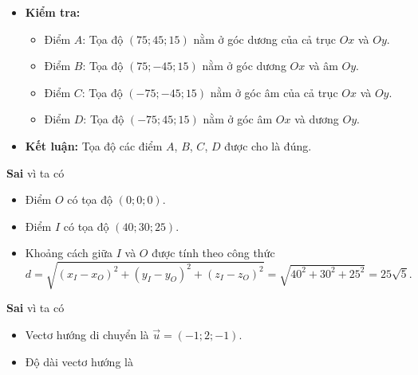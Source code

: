 \begin{ex}
{\begin{itemchoice}
\begin{itemize}
			\begin{itemize}
				\item Chiều dài sân vận động là $150$ m, nên trục $Ox$ chạy từ $-75$ m đến $+75$ m.
				\item Chiều rộng sân vận động là $90$ m, nên trục $Oy$ chạy từ $-45$ m đến $+45$ m.
				\item Các flycam được đặt cách đều mặt đất $30$ m. Thiết bị điều khiển trung tâm $O$ cách mặt đất $15$ m, do đó điểm $O$ có tọa độ $(0;0;0)$ trong hệ trục này (vì chiều $Oz$ dương hướng lên trên).
				\item Các điểm $A$, $B$, $C$, $D$ nằm trên các đường thẳng vuông góc với sân vận động tại các góc, cách mặt đất $30$ m, nên tọa độ của chúng sẽ có hoành độ và tung độ tương ứng với các góc của sân và hoành độ $z = 15$ (vì $O$ cách mặt đất $15$ m, và flycam cách $30$ m mặt đất nên $z = 15$).
			\end{itemize}
			\item \textbf{Kiểm tra:}
			\begin{itemize}
				\item Điểm $A$: Tọa độ $(75; 45; 15)$ nằm ở góc dương của cả trục $Ox$ và $Oy$.
				\item Điểm $B$: Tọa độ $(75; -45; 15)$ nằm ở góc dương $Ox$ và âm $Oy$.
				\item Điểm $C$: Tọa độ $(-75; -45; 15)$ nằm ở góc âm của cả trục $Ox$ và $Oy$.
				\item Điểm $D$: Tọa độ $(-75; 45; 15)$ nằm ở góc âm $Ox$ và dương $Oy$.
			\end{itemize}
			\item \textbf{Kết luận:} Tọa độ các điểm $A$, $B$, $C$, $D$ được cho là đúng.
	\end{itemize}
	\itemch \textbf{Sai} vì ta có
	   \begin{itemize}
		   \item Điểm $O$ có tọa độ $(0;0;0)$.
		   \item Điểm $I$ có tọa độ $(40;30;25)$.
		   \item Khoảng cách giữa $I$ và $O$ được tính theo công thức
		   $$
		   d = \sqrt{(x_I - x_O)^2 + (y_I - y_O)^2 + (z_I - z_O)^2} = \sqrt{40^2 + 30^2 + 25^2}=25\sqrt{5}.
		   $$
	   \end{itemize}
	\itemch \textbf{Sai} vì ta có
	   \begin{itemize}
		   \item Vectơ hướng di chuyển là $\overrightarrow{u} = (-1;2;-1)$.
		   \item Độ dài vectơ hướng là
		   $$
$$
\end{itemize}
\end{itemchoice}}
\end{ex}

